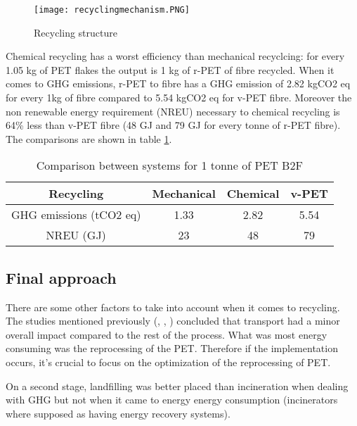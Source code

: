 \documentclass[twoside,a4paper,12pt]{report}
\begin{document}
\begin{figure}[H]
    \centering
    \texttt{[image: recyclingmechanism.PNG]}
    \caption{Recycling structure \cite{Peruginimechanical2005}}
     \label{Recyclingstruct} 
\end{figure}


Chemical recycling has a worst efficiency than mechanical recyclcing: for every 1.05 kg of PET flakes the output is 1 kg of r-PET of fibre recycled. When it comes to GHG emissions, r-PET to fibre has a GHG emission of 2.82 kgCO2 eq for every 1kg of fibre compared to 5.54 kgCO2 eq for v-PET fibre. Moreover the non renewable energy requirement (NREU) necessary to chemical recycling is 64\% less than v-PET fibre (48 GJ and 79 GJ for every tonne of r-PET fibre)\cite{Shen2010}. The comparisons are shown in table \ref{recyclingcompchemicshen2010}.

\begin{table}
\centering
 \begin{tabular}{||c c c c||} 
 \hline
 Recycling & Mechanical & Chemical & v-PET  \\  [0.5ex] 
 \hline\hline
    GHG emissions (tCO2 eq) & 1.33 & 2.82 & 5.54 \\
 \hline
 NREU (GJ) & 23 & 48 & 79 \\
 \hline
 
\end{tabular}
\label{recyclingcompchemicshen2010}
\caption{Comparison between systems for 1 tonne of PET B2F \cite{Shen2010}}
\end{table}



\subsection{Final approach}

There are some other factors to take into account when it comes to recycling. The studies mentioned previously (\cite{Shen2010}, \cite{Perugini2004}, \cite{Shen2011}) concluded that transport had a minor overall impact compared to the rest of the process. What was most energy consuming was the reprocessing of the PET. Therefore if the implementation occurs, it's crucial to focus on the optimization of the reprocessing of PET.

On a second stage, landfilling was better placed than incineration when dealing with GHG but not when it came to energy energy consumption \cite{Nakatani2010} (incinerators where supposed as having energy recovery systems).
\end{document}
